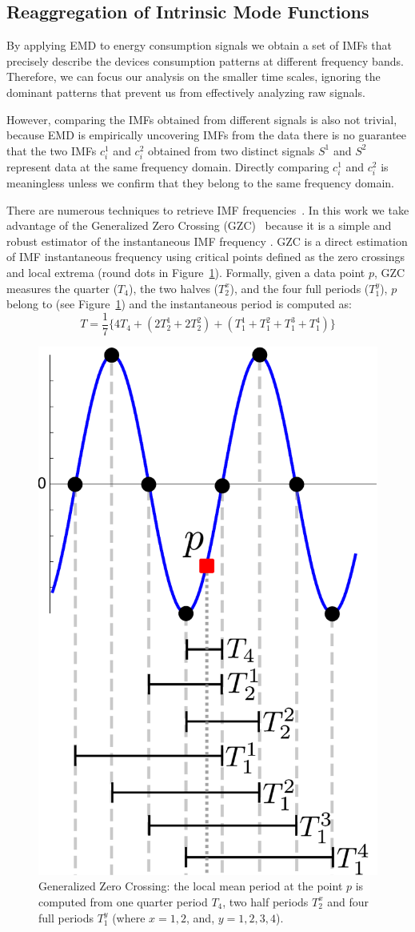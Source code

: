 \subsection{Reaggregation of Intrinsic Mode Functions} \label{methodo:corr}
By applying EMD to energy consumption signals we obtain a set of IMFs that precisely describe the devices consumption 
patterns at different frequency bands.  Therefore, we can focus our analysis on the smaller time scales, ignoring the dominant 
patterns that prevent us from effectively analyzing raw signals.

However, comparing the IMFs obtained from different signals is also not trivial,
 because EMD is empirically uncovering IMFs from the data there is no guarantee that the two IMFs $c_i^1$ and $c_i^2$ obtained from two distinct signals $S^1$ and $S^2$ represent data at the same frequency domain.
Directly comparing $c_i^1$ and $c_i^2$ is meaningless unless we confirm that they belong to the same frequency domain.

There are numerous techniques to retrieve IMF frequencies~\cite{huang:aada2009}.  
In this work we take advantage of the Generalized Zero Crossing (GZC)~\cite{huang:patent2006} because it is a simple and robust 
estimator of the instantaneous IMF frequency \cite{huang:aada2009}.
GZC is a direct estimation of IMF instantaneous frequency using critical points defined as the zero crossings and local extrema 
(round dots in Figure~\ref{fig:gzc}).
Formally, given a data point $p$, GZC measures the quarter ($T_4$), the two halves ($T_2^x$), and the four full periods ($T_1^y$), $p$   
belong to (see Figure~\ref{fig:gzc}) and the instantaneous period is computed as:
\[T=\frac{1}{7}\{4T_4+(2T_2^1+2T_2^2)+(T_1^1+T_1^2+T_1^3+T_1^4)\}\]

\begin{figure}
\begin{center}
 \includegraphics[width=.25\textwidth]{figs/gzc.pdf}
 \end{center}
 \caption{Generalized Zero Crossing: the local mean period at the point $p$ is computed from one quarter period $T_4$, two half periods $T_2^x$ and four full periods $T_1^y$ (where $x=1, 2$, and, $y=1,2,3,4$).}
 \label{fig:gzc}
\end{figure}

